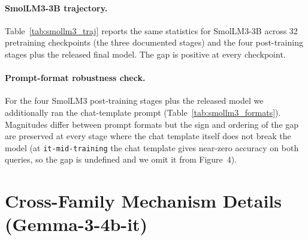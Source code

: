 \documentclass[letterpaper]{article} %
\begin{document}
\paragraph{SmolLM3-3B trajectory.}
Table~\ref{tab:smollm3_traj} reports the same statistics for
SmolLM3-3B across 32 pretraining checkpoints (the three documented
stages) and the four post-training stages plus the released final
model. The gap is positive at every checkpoint.

\paragraph{Prompt-format robustness check.}
For the four SmolLM3 post-training stages plus the released model
we additionally ran the chat-template prompt
(Table~\ref{tab:smollm3_formats}). Magnitudes differ between prompt
formats but the sign and ordering of the gap are preserved at every
stage where the chat template itself does not break the model
(at \texttt{it-mid-training} the chat template gives near-zero
accuracy on both queries, so the gap is undefined and we omit it
from Figure~4).

\begin{table}[!htb]
\centering
\begin{minipage}[t]{0.48\textwidth}
\centering
\scriptsize

\label{tab:smollm2_traj}
\end{minipage}
\hfill
\begin{minipage}[t]{0.48\textwidth}
\centering
\scriptsize

\label{tab:smollm3_traj}

\vspace{0.8em}

\small

\label{tab:smollm3_formats}
\end{minipage}
\end{table}

\section{Cross-Family Mechanism Details (Gemma-3-4b-it)}
\label{app:mechanism_gemma}
\end{document}
